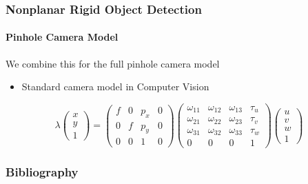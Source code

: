 \documentclass[xetex,professionalfont]{beamer}
\let\oldemph\emph
\renewcommand\emph[1]{\textcolor{tuwcvl_inf_red}{#1}}
\begin{document}
\begin{frame}
\frametitle{Nonplanar Rigid Object Detection}
\framesubtitle{Pinhole Camera Model}

We combine this for the full pinhole camera model
\begin{itemize}
    \item Standard camera model in Computer Vision
\end{itemize}

\[
\lambda
\begin{pmatrix}
    x \\ y \\ 1
\end{pmatrix} =
\begin{pmatrix}
    f & 0 & p_x & 0 \\ 0 & f & p_y & 0 \\ 0 & 0 & 1 & 0
\end{pmatrix}
    \begin{pmatrix}
        \omega_{11} & \omega_{12} & \omega_{13} & \tau_u \\
        \omega_{21} & \omega_{22} & \omega_{23} & \tau_v \\
        \omega_{31} & \omega_{32} & \omega_{33} & \tau_w \\
        0 & 0 & 0 & 1
    \end{pmatrix}
\begin{pmatrix}
    u \\ v \\ w \\ 1
\end{pmatrix}
\]

\end{frame}


\renewcommand\emph[1]{\oldemph{#1}}

\begin{frame}
\frametitle{Bibliography}

\printbibliography

\end{frame}
\end{document}

